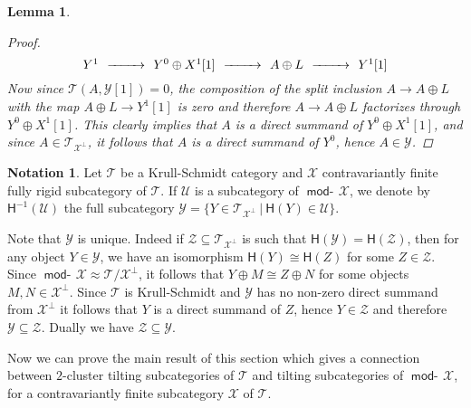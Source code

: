 \documentclass[oneside, a4paper,reqno]{amsart}
\numberwithin{equation}{section}
\newtheorem{lem}[thm]{Lemma}
\theoremstyle{definition}
\newtheorem*{nota}{Notation}
\begin{document}
\begin{lem}
\begin{proof}
\[
\begin{CD}
Y^{1} \, @> >> \, Y^{0} \oplus X^{1}[1] \, @> >>  \,  A \oplus L \, @> >> \, Y^{1}[1]
\end{CD}
\] 
Now since  ${\mathcal T}(A,{\mathcal Y}[1]) = 0$, the composition of the split  inclusion $A {\longrightarrow} A \oplus L$ with the map $A \oplus L {\longrightarrow} Y^{1}[1]$ is zero and therefore $A {\longrightarrow} A \oplus L$ factorizes through $Y^{0} \oplus X^{1}[1]$. This clearly implies that $A$ is a direct summand of $Y^{0} \oplus X^{1}[1]$, and since $A \in {\mathcal T}_{{\mathcal X}^{\bot}}$, it follows that $A$ is a direct summand of $Y^{0}$,  hence $A \in {\mathcal Y}$. 
\end{proof}
\end{lem}

\begin{nota} Let ${\mathcal T}$ be a Krull-Schmidt category and ${\mathcal X}$ contravariantly finite fully rigid subcategory of ${\mathcal T}$. If  ${\mathcal U}$ is  a subcategory of $\operatorname*{\mathsf{mod}-\!}{\mathcal X}$, we denote by $\mathsf{H}^{-1}({\mathcal U})$ the full subcategory ${\mathcal Y} = \{Y \in {\mathcal T}_{{\mathcal X}^{\bot}} \  | \ \mathsf{H}(Y) \in {\mathcal U}\}$. 

 Note that ${\mathcal Y}$ is unique. Indeed if ${\mathcal Z} \subseteq {\mathcal T}_{{\mathcal X}^{\bot}}$ is such that $\mathsf{H}({\mathcal Y}) = \mathsf{H}({\mathcal Z})$, then for any object  $Y\in {\mathcal Y}$,  we have an isomorphism $\mathsf{H}(Y) \cong \mathsf{H}(Z)$ for some $Z \in {\mathcal Z}$.   Since  $\operatorname*{\mathsf{mod}-\!}{\mathcal X} \approx {\mathcal T}/{\mathcal X}^{\bot}$, it follows that $Y \oplus M \cong Z\oplus N$ for some objects $M,N \in {\mathcal X}^{\bot}$.  Since ${\mathcal T}$  is Krull-Schmidt and  ${\mathcal Y}$ has no non-zero direct summand from ${\mathcal X}^{\bot}$ it follows that $Y$ is a direct summand of $Z$, hence $Y \in {\mathcal Z}$ and therefore ${\mathcal Y} \subseteq {\mathcal Z}$. Dually we have ${\mathcal Z} \subseteq {\mathcal Y}$.  
\end{nota} 

Now we can prove the main result of this section which gives a connection between $2$-cluster tilting subcategories of ${\mathcal T}$ and tilting subcategories of $\operatorname*{\mathsf{mod}-\!}{\mathcal X}$, for a contravariantly finite subcategory ${\mathcal X}$ of ${\mathcal T}$.  
\end{document}

